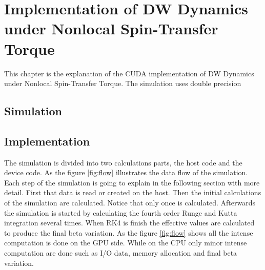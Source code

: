 
\chapter{Implementation of DW Dynamics under Nonlocal Spin-Transfer Torque} %

\label{Implementation of DW Dynamics under Nonlocal Spin-Transfer Torque} %


This chapter is the explanation of the CUDA implementation of DW Dynamics under Nonlocal Spin-Transfer Torque. The simulation uses double precision


\section{Simulation}


\section{Implementation}

The simulation is divided into two calculations parts, the host code and the device code. As the figure \ref{fig:flow} illustrates the data flow of the simulation. Each step of the simulation is going to explain in the following section with more detail. First that data is read or created on the host. Then the initial calculations of the simulation are calculated. Notice that only once is calculated. Afterwards the simulation is started by calculating the fourth order Runge and Kutta integration several times. When RK4 is finish the effective values are calculated to produce the final beta variation. As the figure \ref{fig:flow} shows all the intense computation is done on the GPU side. While on the  CPU only minor intense computation are done such as I/O data, memory allocation and final beta variation. 

